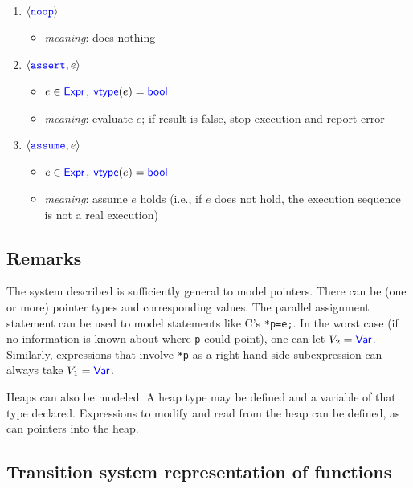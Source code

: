 \documentclass[11pt]{book}
\begin{document}
\begin{enumerate}
\begin{itemize}
  \end{itemize}
\item $\langle\texttt{\textcolor{blue}{noop}}\rangle$
  \begin{itemize}
  \item \emph{meaning}: does nothing
  \end{itemize}
\item $\langle\texttt{\textcolor{blue}{assert}}, e\rangle$
  \begin{itemize}
  \item $e\in\textsf{\textcolor{blue}{\textup{Expr}}}$, $\textsf{\textcolor{blue}{\textup{vtype}}}(e)=\textsf{\textcolor{blue}{\textup{bool}}}$
  \item \emph{meaning}: evaluate $e$; if result is false, stop
    execution and report error
  \end{itemize}
\item  $\langle\texttt{\textcolor{blue}{assume}}, e\rangle$
  \begin{itemize}
  \item $e\in\textsf{\textcolor{blue}{\textup{Expr}}}$, $\textsf{\textcolor{blue}{\textup{vtype}}}(e)=\textsf{\textcolor{blue}{\textup{bool}}}$
  \item \emph{meaning}: assume $e$ holds (i.e., if $e$ does not hold,
    the execution sequence is not a real execution)
  \end{itemize}
\end{enumerate}

\subsection{Remarks}

The system described is sufficiently general to model pointers. There
can be (one or more) pointer types and corresponding values.  The
parallel assignment statement can be used to model statements like
C's \texttt{*p=e;}.  In the worst case (if no information is known
about where \texttt{p} could point), one can let $V_2=\textsf{\textcolor{blue}{\textup{Var}}}$.
Similarly, expressions that involve \texttt{*p} as a right-hand
side subexpression can always take $V_1=\textsf{\textcolor{blue}{\textup{Var}}}$.

Heaps can also be modeled.  A heap type may be defined and a variable
of that type declared.  Expressions to modify and read from the heap
can be defined, as can pointers into the heap.


\subsection{Transition system representation of functions}
\label{sec:gts}
\end{document}
